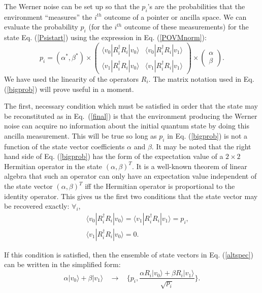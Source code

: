The Werner noise can be set up so that the $p_i$'s are the
probabilities that the environment ``measures'' the $i^{th}$ outcome
of a pointer or ancilla space.  We can evaluate the probability $p_i$
(for the $i^{th}$ outcome of these measurements) for the state
Eq. (\ref{Psistart}) using the expression in Eq. (\ref{POVMnorm}):
\begin{equation}
p_i=(\alpha^\ast,\beta^\ast)\times\left (\begin{array}{cc}
\langle v_0|R_i^\dagger R_i|v_0\rangle&\langle v_0|R_i^\dagger R_i|v_1\rangle\\
\langle v_1|R_i^\dagger R_i|v_0\rangle&\langle v_1|R_i^\dagger R_i|v_1\rangle
\end{array}\right )\times\left (\begin{array}{c}\alpha\\ \beta
\end{array}\right ).\label{bigprob}
\end{equation}
We have used the linearity of the operators $R_i$.  The matrix notation
used in Eq. (\ref{bigprob}) will prove useful in a moment.
 
The first, necessary condition which must be satisfied in order that
the state may be reconstituted as in Eq.~(\ref{final}) is that the
environment producing the Werner noise can acquire no information
about the initial quantum state by doing this ancilla measurement.
This will be true so long as $p_i$ in Eq. (\ref{bigprob}) is not a
function of the state vector coefficients $\alpha$ and $\beta$.  It
may be noted that the right hand side of Eq. (\ref{bigprob}) has the
form of the expectation value of a $2\times 2$ Hermitian operator in
the state $(\alpha, \beta)^T$.  It is a well-known theorem of linear
algebra that such an operator can only have an expectation value
independent of the state vector $(\alpha,\beta)^T$ iff the Hermitian
operator is proportional to the identity operator.  This gives us the
first two conditions that the state vector may be recovered exactly:
$\forall_i$,
\begin{eqnarray}
&&\langle v_0|R_i^\dagger R_i|v_0\rangle=\langle v_1|R_i^\dagger R_i|v_1
\rangle=p_i,\nonumber\\
&&\langle v_1|R_i^\dagger R_i|v_0\rangle=0.
\end{eqnarray}
 
If this condition is satisfied, then the ensemble of state vectors
in Eq. (\ref{altspec}) can be written in the simplified form:
\begin{equation}
\alpha|v_0\rangle+\beta|v_1\rangle\ \ \ \ \rightarrow\ \ \ \ \{p_i,
\frac{\alpha R_i|v_0\rangle+\beta R_i|v_1\rangle}
{\sqrt{p_i}}\}.\label{simplified}
\end{equation}
 
